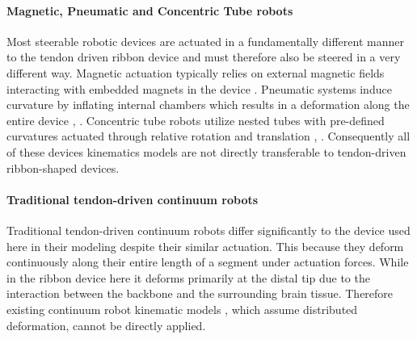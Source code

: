 \paragraph*{Magnetic, Pneumatic and Concentric Tube robots}
Most steerable robotic devices are actuated in a fundamentally different manner to the tendon driven ribbon device and must therefore also be steered in a very different way. Magnetic actuation typically relies on external magnetic fields interacting with embedded magnets in the device \cite{petruska_magnetic_2016} \cite{pancaldi_flow_2020}. Pneumatic systems induce curvature by inflating internal chambers which results in a deformation along the entire device  \cite{gopesh_soft_2021}, \cite{luo_novel_2023}. Concentric tube robots utilize nested tubes with pre-defined curvatures actuated through relative rotation and translation \cite{dupont_continuum_2022}, \cite{alfalahi_concentric_2020}. Consequently all of these devices kinematics models are not directly transferable to tendon-driven ribbon-shaped devices.

\paragraph*{Traditional tendon-driven continuum robots}
Traditional tendon-driven continuum robots differ significantly to the device used here in their modeling despite their similar actuation. This because they deform continuously along their entire length of a segment under actuation forces. While in the ribbon device here it deforms primarily at the distal tip due to the interaction between the backbone and the surrounding brain tissue. Therefore existing continuum robot kinematic models \cite{chitalia_design_2020} \cite{kato_tendon-driven_2016}, which assume distributed deformation, cannot be directly applied.

